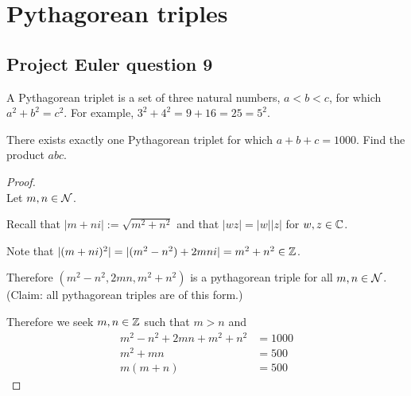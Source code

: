 \newpage
\section{Pythagorean triples}

\subsection*{Project Euler question 9}

\begin{mdframed}
  A Pythagorean triplet is a set of three natural numbers, $a < b < c$, for which
  $a^2 + b^2 = c^2$.  For example, $3^2 + 4^2 = 9 + 16 = 25 = 5^2$.

  There exists exactly one Pythagorean triplet for which $a + b + c = 1000$.  Find the product
  $abc$.
\end{mdframed}

\begin{proof}~\\
  Let $m, n \in \mathcal{N}$.

  Recall that $|m + ni| := \sqrt{m^2 + n^2}$ and that $|wz| = |w| |z|$ for $w, z \in \mathbb{C}$.

  Note that $|(m + ni)^2| = |(m^2 - n^2) + 2mni| = m^2 + n^2 \in \mathbb{Z}$.

  Therefore $(m^2 - n^2, 2mn, m^2 + n^2)$ is a pythagorean triple for all $m, n \in
  \mathcal{N}$. (Claim: all pythagorean triples are of this form.)

  Therefore we seek $m, n \in \mathbb{Z}$ such that $m > n$ and
  \begin{align*}
    m^2 - n^2 + 2mn + m^2 + n^2 &= 1000\\
    m^2 + mn                   &= 500\\
    m(m+n)                     &= 500
  \end{align*}

\end{proof}